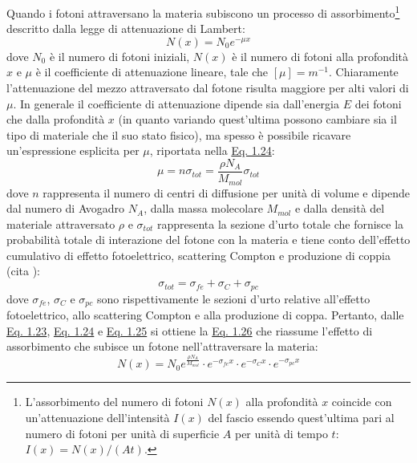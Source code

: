 \documentclass[12pt,a4paper,twoside]{report}
\begin{document}
	Quando i fotoni attraversano la materia subiscono un processo di assorbimento\footnote{L'assorbimento del numero di fotoni $N(x)$ alla profondità $x$ coincide con un'attenuazione dell'intensità $I(x)$ del fascio essendo quest'ultima pari al numero di fotoni per unità di superficie $A$ per unità di tempo $t$: $I(x)=N(x)/(At)$.} descritto dalla legge di attenuazione di Lambert:
	\begin{equation}
		N(x)=N_0e^{-\mu x}
		\label{eq:lambert}
	\end{equation}
	dove $N_0$ è il numero di fotoni iniziali, $N(x)$ è il numero di fotoni alla profondità $x$ e $\mu$ è il coefficiente di attenuazione lineare, tale che $\left[\mu\right]=m^{-1}$. Chiaramente l'attenuazione del mezzo attraversato dal fotone risulta maggiore per alti valori di $\mu$. In generale il coefficiente di attenuazione dipende sia dall'energia $E$ dei fotoni che dalla profondità $x$ (in quanto variando quest'ultima possono cambiare sia il tipo di materiale che il suo stato fisico), ma spesso è possibile ricavare un'espressione esplicita per $\mu$, riportata nella \hyperref[eq:attenuazione]{Eq. 1.24}:
	\begin{equation}
		\mu=n\sigma_{tot}=\frac{\rho N_A}{M_{mol}}\sigma_{tot}
		\label{eq:attenuazione}
	\end{equation}
	dove $n$ rappresenta il numero di centri di diffusione per unità di volume e dipende dal numero di Avogadro $N_A$, dalla massa molecolare $M_{mol}$ e dalla densità del materiale attraversato $\rho$ e $\sigma_{tot}$ rappresenta la sezione d'urto totale che fornisce la probabilità totale di interazione del fotone con la materia e tiene conto dell'effetto cumulativo di effetto fotoelettrico, scattering Compton e produzione di coppia (cita
	):
	\begin{equation}
		\sigma_{tot}=\sigma_{fe}+\sigma_{C}+\sigma_{pc}
		\label{eq:sum_cross_section}
	\end{equation}
	dove $\sigma_{fe}$, $\sigma_{C}$ e $\sigma_{pc}$ sono rispettivamente le sezioni d'urto relative all'effetto fotoelettrico, allo scattering Compton e alla produzione di coppa. Pertanto, dalle \hyperref[eq:lambert]{Eq. 1.23}, \hyperref[eq:attenuazione]{Eq. 1.24} e \hyperref[eq:sum_cross_section]{Eq. 1.25} si ottiene la \hyperref[eq:photon_absorption]{Eq. 1.26} che riassume l'effetto di assorbimento che subisce un fotone nell'attraversare la materia:
	\begin{equation}
		N(x)=N_0e^{\frac{\rho N_A}{M_{mol}}}\cdot e^{-\sigma_{fe}x}\cdot e^{-\sigma_{C}x}\cdot e^{-\sigma_{pc}x}
		\label{eq:photon_absorption}
	\end{equation}
	
\end{document}
